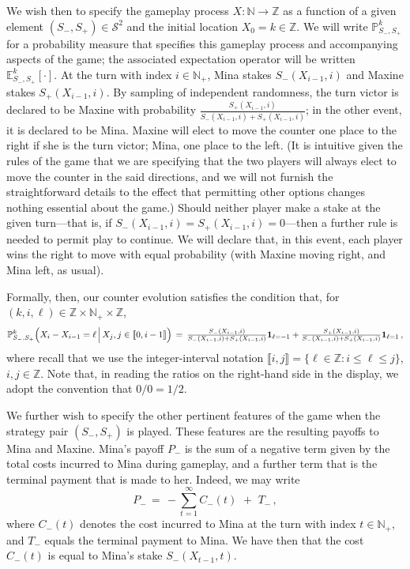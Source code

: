 \documentclass[letterpaper,11pt,oneside,reqno]{amsbook}
\newcommand{\PP}{\ensuremath{\mathbb{P}}}
\newcommand{\N}{\ensuremath{\mathbb{N}}}
\newcommand{\Z}{\ensuremath{\mathbb{Z}}}
\newcommand{\E}[0]{\mathbb{E}}
\numberwithin{figure}{chapter}
\theoremstyle{definition}
\theoremstyle{definition}
\theoremstyle{definition}
\theoremstyle{definition}
\theoremstyle{definition}
\newcommand{\mc}{\mathcal}
\newcommand{\nwithzero}{\N}
\newcommand{\nwithoutzero}{\N_+}
\newcommand\pgameplay[3]{\PP^{#3}_{#1,#2}}
\newcommand\egameplay[3]{\E^{#3}_{#1,#2}}
\def\hfff#1{\label{#1}}
\begin{document}
We wish then to specify the gameplay process\hfff{counter}  $X:\nwithzero \to \Z$ as a function of a given element $(S_-,S_+) \in \mc{S}^2$ and the initial location $X_0 = k \in \Z$. 
We will write $\pgameplay{S_-}{S_+}{k}$ for a probability measure that specifies this gameplay process and accompanying aspects of the game; the associated expectation operator will be written $\egameplay{S_-}{S_+}{k}[\cdot]$.
At the turn with index $i \in \nwithoutzero$, Mina stakes $S_-(X_{i-1},i)$ and Maxine stakes  $S_+(X_{i-1},i)$. By sampling of independent randomness, the turn victor is declared to be Maxine with probability  $\tfrac{S_+(X_{i-1},i)}{S_-(X_{i-1},i) + S_+(X_{i-1},i)}$; in the other event, it is declared to be Mina. Maxine will elect to move the counter one place to the right if she is the turn victor; Mina, one place to the left. 
(It is intuitive given the rules of the game that we are specifying that the two players will always elect to move the counter in the said directions, and we will not furnish the straightforward details to the effect that permitting other options changes nothing essential about the game.)
Should neither player make a stake at the given turn---that is, if  $S_-(X_{i-1},i) = S_+(X_{i-1},i) = 0$---then a further rule is needed to permit play to continue. We will declare that, in this event, each player wins the right to move with equal probability (with Maxine moving right, and Mina left, as usual).  

Formally, then, our counter evolution satisfies the condition that,
for $(k,i,\ell) \in \Z \times \nwithoutzero \times \Z$, 
$$
\pgameplay{S_-}{S_+}{k} \Big( X_i - X_{i-1} = \ell \, \Big\vert \, X_j, j \in \llbracket 0, i-1 \rrbracket \Big) \, = \, \tfrac{S_-(X_{i-1},i)}{S_-(X_{i-1},i) + S_+(X_{i-1},i)} {\bf 1}_{\ell = - 1} + \tfrac{S_+(X_{i-1},i)}{S_-(X_{i-1},i) + S_+(X_{i-1},i)} {\bf 1}_{\ell = 1} \, ,
$$
where recall that we use the integer-interval notation $\llbracket i,j \rrbracket = \big\{ \ell \in \Z: i \leq \ell \leq j \big\}$, $i,j \in \Z$.
Note that,
in reading the ratios on the right-hand side in the display, we adopt the convention that $0/0 = 1/2$.


We further wish to specify the other pertinent features of the game when the strategy pair $(S_-,S_+)$ is played. These features are the resulting payoffs to Mina and Maxine. 
Mina's payoff $P_-$ is the sum of a negative term given by the total costs incurred to Mina during gameplay, and a further term that is the terminal payment that is made to her. 
Indeed, we may write\hfff{receiptmina}
\begin{equation}\label{e.minapayoff}
 P_- \, = \,  - \sum_{t = 1}^\infty C_-(t) \, \, + \, \, T_-  \, , 
\end{equation}
where $C_-(t)$ denotes the cost incurred to Mina at the turn with index $t \in \nwithoutzero$,
and $T_-$ equals the terminal payment to Mina. We have then that the cost $C_-(t)$ is equal to Mina's stake $S_-(X_{t-1},t)$.
\end{document}
